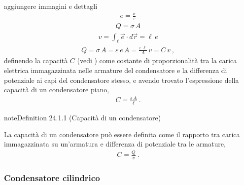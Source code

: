 \documentclass[letterpaper,10pt,italian]{jupyterBook}
\begin{document}
\sphinxAtStartPar
{} aggiungere immagini e dettagli
\begin{equation*}
\begin{split}e = \frac{\sigma}{\varepsilon}\end{split}
\end{equation*}\begin{equation*}
\begin{split}Q = \sigma \, A\end{split}
\end{equation*}\begin{equation*}
\begin{split}v = \int_{\ell} \vec{e} \cdot d \vec{r} = \ell \, e\end{split}
\end{equation*}\begin{equation*}
\begin{split} Q = \sigma \, A = \varepsilon \, e \, A = \frac{\varepsilon \, \ell}{A} \, v = C \, v \ ,\end{split}
\end{equation*}
\sphinxAtStartPar
definendo la capacità \(C\) (vedi {\hyperref[\detokenize{ch/electromagnetism/electrostatics:capacitor-capacity}]{}}) come costante di proporzionalità tra la carica elettrica immagazzinata nelle armature del condensatore e la differenza di potenziale ai capi del condensatore stesso, e avendo trovato l’espressione della capacità di un condensatore piano,
\begin{equation*}
\begin{split}C = \frac{\varepsilon \, A}{\ell} \ .\end{split}
\end{equation*}\label{ch/electromagnetism/electrostatics:capacitor-capacity}
\begin{sphinxadmonition}{note}{Definition 24.1.1 (Capacità di un condensatore)}



\sphinxAtStartPar
La capacità di un condensatore può essere definita come il rapporto tra carica immagazzinata su un’armatura e differenza di potenziale tra le armature,
\begin{equation*}
\begin{split}C = \frac{Q}{v} \ .\end{split}
\end{equation*}\end{sphinxadmonition}
\subsubsection*{Condensatore cilindrico}
\end{document}
